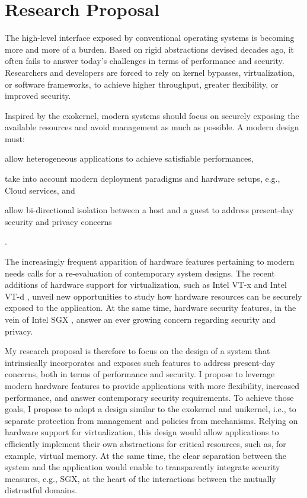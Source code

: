 \section{Research Proposal}

The high-level interface exposed by conventional operating systems is becoming more and more of a burden.
Based on rigid abstractions devised decades ago, it often fails to answer today's challenges in terms of performance and security.
Researchers and developers are forced to rely on kernel bypasses, virtualization, or software frameworks, to achieve higher throughput, greater flexibility, or improved security.

Inspired by the exokernel, modern systems should focus on securely exposing the available resources and avoid management as much as possible.
A modern design must:
\begin{enumerate*}
	\item allow heterogeneous applications to achieve satisfiable performances,
	\item take into account modern deployment paradigms and hardware setups, e.g., Cloud services, and 
	\item allow bi-directional isolation between a host and a guest to address present-day security and privacy concerns
\end{enumerate*}.

The increasingly frequent apparition of hardware features pertaining to modern needs \cite{HardIsSoft} calls for a re-evaluation of contemporary system designs.
The recent additions of hardware support for virtualization, such as Intel VT-x \cite{DBLP:journals/computer/UhligNRSMABKLS05} and Intel VT-d \cite{intelVTD}, unveil new opportunities to study how hardware resources can be securely exposed to the application.
At the same time, hardware security features, in the vein of Intel SGX \cite{SGXManual}, answer an ever growing concern regarding security and privacy.

My research proposal is therefore to focus on the design of a system that intrinsically incorporates and exposes such features to address present-day concerns, both in terms of performance and security.
I propose to leverage modern hardware features to provide applications with more flexibility, increased performance, and answer contemporary security requirements.
To achieve those goals, I propose to adopt a design similar to the exokernel and unikernel, i.e., to separate protection from management and policies from mechanisms.
Relying on hardware support for virtualization, this design would allow applications to efficiently implement their own abstractions for critical resources, such as, for example, virtual memory.
At the same time, the clear separation between the system and the application would enable to transparently integrate security measures, e.g., SGX, at the heart of the interactions between the mutually distrustful domains.
